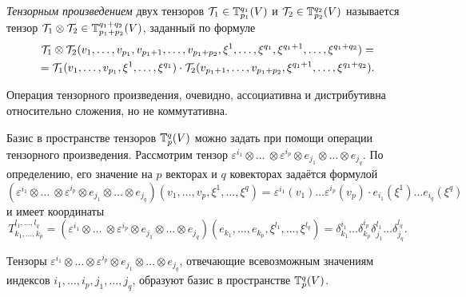 \begin{definition}
    \textit{Тензорным произведением} двух тензоров $\mathcal{T}_1 \in \mathbb{T}_{p_1}^{q_1}(V)$ и $\mathcal{T}_2 \in \mathbb{T}_{p_2}^{q_2}(V)$ называется тензор $\mathcal{T}_1 \otimes \mathcal{T}_2 \in \mathbb{T}_{p_1 + p_2}^{q_1 + q_2}(V)$, заданный по формуле
    \begin{multline*}
        \mathcal{T}_1 \otimes \mathcal{T}_2(v_1, \ldots, v_{p_1}, v_{p_1 + 1}, \ldots, v_{p_1 + p_2}, \xi^1, \ldots, \xi^{q_1}, \xi^{q_1 + 1}, \ldots, \xi^{q_1 + q_2}) =\\ = \mathcal{T}_1(v_1, \ldots, v_{p_1}, \xi^1, \ldots, \xi^{q_1}) \cdot \mathcal{T}_2(v_{p_1 + 1}, \ldots, v_{p_1 + p_2}, \xi^{q_1 + 1}, \ldots, \xi^{q_1 + q_2}).
    \end{multline*}
\end{definition}

Операция тензорного произведения, очевидно, ассоциативна и дистрибутивна относительно сложения, но не коммутативна.

Базис в пространстве тензоров $\mathbb{T}_p^q(V)$ можно задать при помощи операции тензорного произведения. Рассмотрим тензор $\varepsilon^{i_1} \otimes \ldots\ \otimes \varepsilon^{i_p} \otimes e_{j_1} \otimes \ldots \otimes e_{j_q}$. По определению, его значение на $p$ векторах и $q$ ковекторах задаётся формулой
\[
    (\varepsilon^{i_1} \otimes \ldots\ \otimes \varepsilon^{i_p} \otimes e_{j_1} \otimes \ldots \otimes e_{j_q})(v_1, \ldots, v_p, \xi^1, \ldots, \xi^q) = \varepsilon^{i_1}(v_1) \ldots \varepsilon^{i_p}(v_p) \cdot e_{i_1}(\xi^1) \ldots e_{i_q}(\xi^q)
\]
и имеет координаты
\[
    T_{k_1, \ldots, k_p}^{l_1, \ldots, l_q} = (\varepsilon^{i_1} \otimes \ldots\ \otimes \varepsilon^{i_p} \otimes e_{j_1} \otimes \ldots \otimes e_{j_q})(e_{k_1}, \ldots, e_{k_p}, \xi^{l_1}, \ldots, \xi^{l_q}) = \delta_{k_1}^{i_1}\ldots\delta_{k_p}^{i_p}\delta_{j_1}^{l_1}\ldots\delta_{j_q}^{l_q}.
\]

\begin{theorem}
    Тензоры $\varepsilon^{i_1} \otimes \ldots \otimes \varepsilon^{i_p} \otimes e_{j_1} \otimes \ldots \otimes e_{j_q}$, отвечающие всевозможным значениям индексов $i_1, \ldots, i_p, j_1, \ldots, j_q$, образуют базис в пространстве $\mathbb{T}_p^q(V)$.
\end{theorem}

